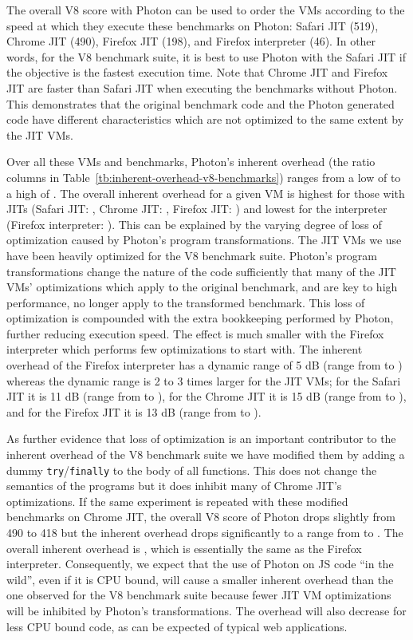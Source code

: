The overall V8 score with Photon can be used to order the VMs
according to the speed at which they execute these benchmarks on
Photon: Safari JIT (519), Chrome JIT (490), Firefox JIT (198), and
Firefox interpreter (46).  In other words, for the V8 benchmark suite,
it is best to use Photon with the Safari JIT if the objective is the
fastest execution time.  Note that Chrome JIT and Firefox JIT are
faster than Safari JIT when executing the benchmarks without Photon.
This demonstrates that the original benchmark code and the Photon
generated code have different characteristics which are not optimized
to the same extent by the JIT VMs.

Over all these VMs and benchmarks, Photon's inherent overhead (the
ratio columns in Table~\ref{tb:inherent-overhead-v8-benchmarks})
ranges from a low of  to a high of .  The overall inherent
overhead for a given VM is highest for those with JITs (Safari JIT:
, Chrome JIT: , Firefox JIT: ) and lowest for the
interpreter (Firefox interpreter: ).  This can be explained by the
varying degree of loss of optimization caused by Photon's program
transformations.  The JIT VMs we use have been heavily optimized for
the V8 benchmark suite.  Photon's program transformations change the
nature of the code sufficiently that many of the JIT VMs' optimizations
which apply to the original benchmark, and are key to high performance,
no longer apply to the transformed benchmark.  This loss of
optimization is compounded with the extra bookkeeping performed by
Photon, further reducing execution speed.  The effect is much smaller
with the Firefox interpreter which performs few optimizations to start
with.  The inherent overhead of the Firefox interpreter has a dynamic
range of 5 dB (range from  to ) whereas the dynamic range is
2 to 3 times larger for the JIT VMs; for the Safari JIT it is 11 dB
(range from  to ), for the Chrome JIT it is 15 dB (range from
 to ), and for the Firefox JIT it is 13 dB (range from 
to ).

As further evidence that loss of optimization is an important
contributor to the inherent overhead of the V8 benchmark suite we have
modified them by adding a dummy {\tt try}/{\tt finally} to the body of
all functions.  This does not change the semantics of the programs but
it does inhibit many of Chrome JIT's optimizations.  If the
same experiment is repeated with these modified benchmarks on
Chrome JIT, the overall V8 score of Photon drops slightly from 490
to 418 but the inherent overhead drops significantly to a range from
 to .  The overall inherent overhead is , which is
essentially the same as the Firefox interpreter.  Consequently, we
expect that the use of Photon on JS code ``in the wild'', even
if it is CPU bound, will cause a smaller inherent overhead than the
one observed for the V8 benchmark suite because fewer JIT VM optimizations
will be inhibited by Photon's transformations.  The overhead will also
decrease for less CPU bound code, as can be expected of typical web
applications.

